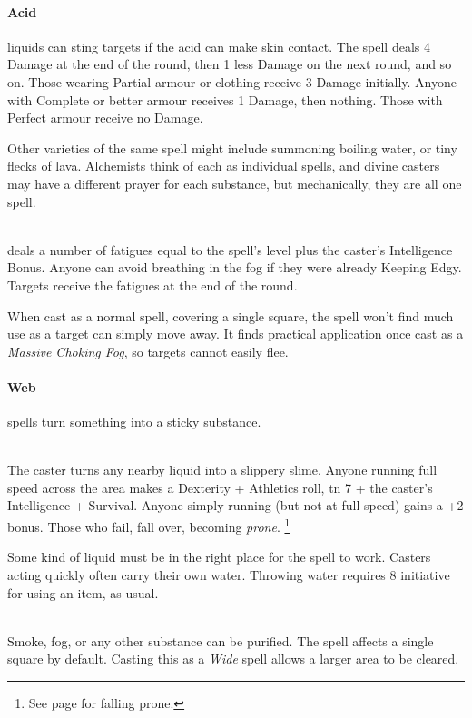 \begin{multicols}{2}
\paragraph{Acid}
liquids can sting targets if the acid can make skin contact.
The spell deals 4 Damage at the end of the round, then 1 less Damage on the next round, and so on.
Those wearing Partial armour or clothing receive 3 Damage initially.
Anyone with Complete or better armour receives 1 Damage, then nothing.
Those with Perfect armour receive no Damage.

Other varieties of the same spell might include summoning boiling water, or tiny flecks of lava.
Alchemists think of each as individual spells, and divine casters may have a different prayer for each substance, but mechanically, they are all one spell.

\\
deals a number of \glspl{fatigue} equal to the spell's level plus the caster's Intelligence Bonus.
Anyone can avoid breathing in the fog if they were already Keeping Edgy.
Targets receive the \glspl{fatigue} at the end of the round.

When cast as a normal spell, covering a single square, the spell won't find much use as a target can simply move away.
It finds practical application once cast as a \textit{Massive Choking Fog}, so targets cannot easily flee.

\paragraph{Web}
spells turn something into a sticky substance.

\\
The caster turns any nearby liquid into a slippery slime.
Anyone running full speed across the area makes a Dexterity + Athletics roll, \gls{tn} 7 + the caster's Intelligence + Survival.
Anyone simply running (but not at full speed) gains a +2 bonus.
Those who fail, fall over, becoming \textit{prone}.%
\footnote{See page \pageref{prone} for falling prone.}

Some kind of liquid must be in the right place for the spell to work.
Casters acting quickly often carry their own water.  Throwing water requires 8 initiative for using an item, as usual.

\\
Smoke, fog, or any other substance can be purified.
The spell affects a single square by default.
Casting this as a \textit{Wide} spell allows a larger area to be cleared.


\end{multicols}
